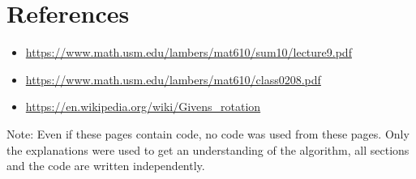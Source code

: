 \documentclass[a4paper]{scrartcl}
\begin{document}
\section{References}
    \begin{itemize}
        \item \url{https://www.math.usm.edu/lambers/mat610/sum10/lecture9.pdf}
        \item \url{https://www.math.usm.edu/lambers/mat610/class0208.pdf}
        \item \url{https://en.wikipedia.org/wiki/Givens_rotation}
    \end{itemize}
    Note: Even if these pages contain code, no code was used from these pages.
    Only the explanations were used to get an understanding of the algorithm, all
    sections and the code are written independently.
\end{document}
